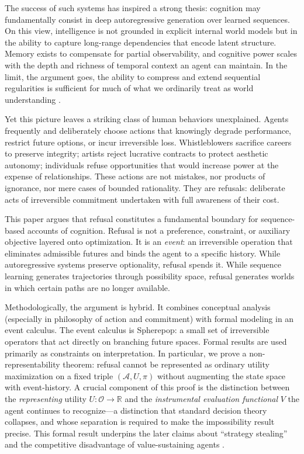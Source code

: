 \documentclass[11pt]{article}
\newcommand{\Act}{\mathcal{A}}
\begin{document}
The success of such systems has inspired a strong thesis: cognition may
fundamentally consist in deep autoregressive generation over learned sequences.
On this view, intelligence is not grounded in explicit internal world models but
in the ability to capture long-range dependencies that encode latent structure.
Memory exists to compensate for partial observability, and cognitive power scales
with the depth and richness of temporal context an agent can maintain. In the
limit, the argument goes, the ability to compress and extend sequential
regularities is sufficient for much of what we ordinarily treat as world
understanding \cite{barenholtz2025sequences}.

Yet this picture leaves a striking class of human behaviors unexplained. Agents
frequently and deliberately choose actions that knowingly degrade performance,
restrict future options, or incur irreversible loss. Whistleblowers sacrifice
careers to preserve integrity; artists reject lucrative contracts to protect
aesthetic autonomy; individuals refuse opportunities that would increase power at
the expense of relationships. These actions are not mistakes, nor products of
ignorance, nor mere cases of bounded rationality. They are refusals: deliberate
acts of irreversible commitment undertaken with full awareness of their cost.

This paper argues that refusal constitutes a fundamental boundary for
sequence-based accounts of cognition. Refusal is not a preference, constraint, or
auxiliary objective layered onto optimization. It is an \emph{event}: an
irreversible operation that eliminates admissible futures and binds the agent to
a specific history. While autoregressive systems preserve optionality, refusal
spends it. While sequence learning generates trajectories through possibility
space, refusal generates worlds in which certain paths are no longer available.

Methodologically, the argument is hybrid. It combines conceptual analysis
(especially in philosophy of action and commitment) with formal modeling in an
event calculus. The event calculus is Spherepop: a small set of irreversible
operators that act directly on branching future spaces. Formal results are used
primarily as constraints on interpretation. In particular, we prove a
non-representability theorem: refusal cannot be represented as ordinary utility
maximization on a fixed triple $(\Act, U, \pi)$ without augmenting the state
space with event-history. A crucial component of this proof is the distinction
between the \emph{representing} utility $U: \mathcal{O} \to \mathbb{R}$ and
the \emph{instrumental evaluation functional} $V$ the agent continues to
recognize---a distinction that standard decision theory collapses, and whose
separation is required to make the impossibility result precise. This formal
result underpins the later claims about ``strategy stealing'' and the
competitive disadvantage of value-sustaining agents \cite{carlsmith2025goodness}.
\end{document}
